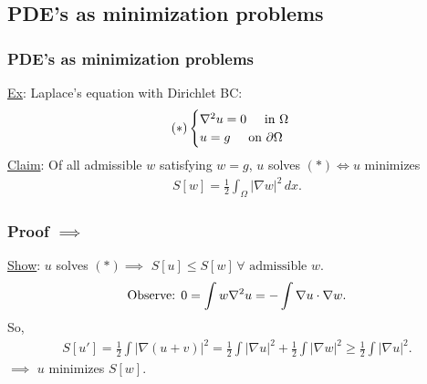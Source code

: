\documentclass{beamer}
\theoremstyle{definition}
\newcommand{\p}{\partial}
\begin{document}

\subsection{PDE's as minimization problems}


\begin{frame}
\frametitle{PDE's as minimization problems}
\underline{Ex}: Laplace's equation with Dirichlet BC:
\begin{align*}
(\ast)\begin{cases}
\laplacian u = 0 \hspace{0.5cm} \text{in $\Omega$}\\
u = g \hspace{0.5cm} \text{on $\p \Omega$}
\end{cases}
\end{align*}
\pause
\underline{Claim}: Of all admissible $w$ satisfying $w=g$,
 $u$ solves $(\ast) \iff u$ minimizes
\begin{align*}
S[w] = \frac{1}{2}\int_\Omega \vert \nabla w \vert^2\,dx.  
\end{align*} 
\end{frame}


\begin{frame}
\frametitle{Proof $\implies$}
\underline{Show}: $u$ solves $(\ast) \implies $ $S[u] \leq S[w]\, \forall \text{ admissible } w$. 
\pause
\begin{align*}
\text{Observe: }0 = \int w\laplacian u = -\int \nabla u \cdot \nabla w.
\end{align*}
\pause
So,
\begin{align*}
S[u'] = \frac{1}{2}\int\vert\nabla(u+v)\vert^2 = \frac{1}{2}\int \vert\nabla u\vert^2 + \frac{1}{2}\int \vert\nabla w\vert^2 \geq \frac{1}{2}\int \vert\nabla u\vert^2.
\end{align*}
\pause
$\implies $ $u$ minimizes $S[w]$. 
\end{frame}

\end{document}
